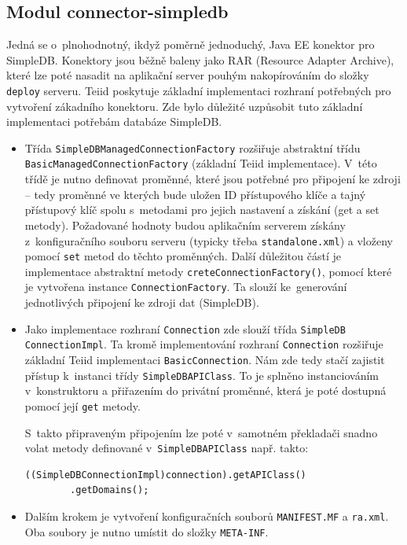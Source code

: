\documentclass[oneside,12pt,final]{fithesis2}
\begin{document}
\subsection{Modul connector-simpledb}
\label{connector-simpledb}
Jedná se o~plnohodnotný, ikdyž poměrně jednoduchý, Java EE konektor pro SimpleDB. Konektory jsou běžně baleny jako RAR (Resource Adapter Archive), které lze poté nasadit na aplikační server pouhým nakopírováním do složky \texttt{deploy} serveru. Teiid poskytuje základní implementaci rozhraní potřebných pro vytvoření zákadního konektoru. Zde bylo důležité uzpůsobit tuto základní implementaci potřebám databáze SimpleDB. 
\begin{itemize}
 \item Třída \texttt{SimpleDBManagedConnectionFactory} rozšiřuje abstraktní třídu \texttt{BasicManagedConnectionFactory} (základní Teiid implementace). V~této třídě je nutno definovat proměnné, které jsou potřebné pro připojení ke zdroji -- tedy proměnné ve kterých bude uložen ID přístupového klíče a tajný přístupový klíč spolu s~metodami pro jejich nastavení a získání (get a set metody). Požadované hodnoty budou aplikačním serverem získány z~konfiguračního souboru serveru (typicky třeba \texttt{standalone.xml}) a vloženy pomocí 
 \texttt{set} metod do těchto proměnných. Další důležitou částí je implementace abstraktní metody \texttt{creteConnectionFactory()}, pomocí které je vytvořena instance \texttt{ConnectionFactory}. Ta slouží ke~generování jednotlivých připojení ke zdroji dat (SimpleDB).
 
 \item Jako implementace rozhraní \texttt{Connection} zde slouží třída \texttt{SimpleDB ConnectionImpl}. Ta kromě implementování rozhraní \texttt{Connection} rozšiřuje základní Teiid implementaci \texttt{BasicConnection}. Nám zde tedy stačí zajistit přístup k~instanci třídy \texttt{SimpleDBAPIClass}. To je splněno instanciováním v~konstruktoru a přiřazením do privátní proměnné, která je poté dostupná pomocí její \texttt{get} metody.
 
 S~takto připraveným připojením lze poté v~samotném překladači snadno volat metody definované v~\texttt{SimpleDBAPIClass} např. takto:
 \begin{Verbatim}[fontsize=\small]
((SimpleDBConnectionImpl)connection).getAPIClass()
		.getDomains();
 \end{Verbatim}
 \item Dalším krokem je vytvoření konfiguračních souborů \texttt{MANIFEST.MF} a \texttt{ra.xml}. Oba soubory je nutno umístit do složky \texttt{META-INF}. 
 

\end{itemize}
\end{document}
